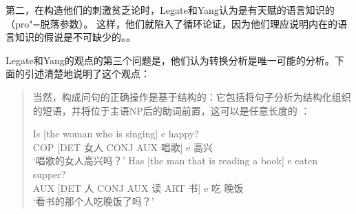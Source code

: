 第二，在构造他们的刺激贫乏论时，Legate和Yang认为是有天赋的语言知识的（pro"=脱落参数）。
这样，他们就陷入了循环论证，因为他们理应说明内在的语言知识的假说是不可缺少的。\citep[]{SP2002b}。

Legate和Yang的观点的第三个问题是，他们认为转换分析是唯一可能的分析。下面的引述清楚地说明了这个观点\citep[]{LY2002a}：
\begin{quote}
当然，构成问句的正确操作是基于结构的：它包括将句子分析为结构化组织的短语，并将位于主语NP后的助词前置，这可以是任意长度的 ：
\begin{exe}
\begin{xlist}
\ex 
\gll Is [the woman who is singing] e happy?\\
COP [DET 女人 CONJ AUX 唱歌] e 高兴\\
\glt `唱歌的女人高兴吗？'
\ex 
\gll Has [the man that is reading a book] e eaten supper?\\
AUX [DET 人 CONJ AUX 读 ART 书] e 吃 晚饭\\
\glt `看书的那个人吃晚饭了吗？'
\end{xlist}
\end{exe}
\end{quote}

